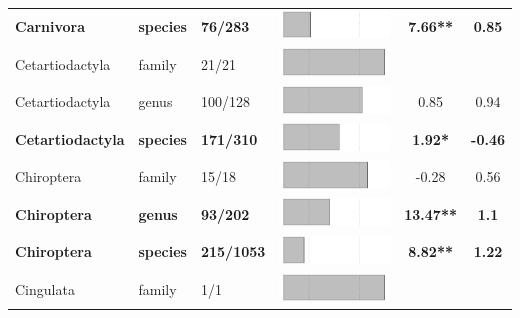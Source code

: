 \begin{longtable}{lL{1.8cm}C{2cm}lcc}
  \textbf{Carnivora} & \textbf{species} & \textbf{76/283} & \includegraphics[width=0.20\linewidth, height=0.05\linewidth]{Results_1c/Table_figures/bar6.pdf} & \textbf{7.66**} & \textbf{0.85} \\ 
  Cetartiodactyla & family & 21/21 & \includegraphics[width=0.20\linewidth, height=0.05\linewidth]{Results_1c/Table_figures/bar7.pdf} &   &   \\ 
  Cetartiodactyla & genus & 100/128 & \includegraphics[width=0.20\linewidth, height=0.05\linewidth]{Results_1c/Table_figures/bar8.pdf} & 0.85 & 0.94 \\ 
  \textbf{Cetartiodactyla} & \textbf{species} & \textbf{171/310} & \includegraphics[width=0.20\linewidth, height=0.05\linewidth]{Results_1c/Table_figures/bar9.pdf} & \textbf{1.92*} & \textbf{-0.46} \\ 
  Chiroptera & family & 15/18 & \includegraphics[width=0.20\linewidth, height=0.05\linewidth]{Results_1c/Table_figures/bar10.pdf} & -0.28 & 0.56 \\ 
  \textbf{Chiroptera} & \textbf{genus} & \textbf{93/202} & \includegraphics[width=0.20\linewidth, height=0.05\linewidth]{Results_1c/Table_figures/bar11.pdf} & \textbf{13.47**} & \textbf{1.1} \\ 
  \textbf{Chiroptera} & \textbf{species} & \textbf{215/1053} & \includegraphics[width=0.20\linewidth, height=0.05\linewidth]{Results_1c/Table_figures/bar12.pdf} & \textbf{8.82**} & \textbf{1.22} \\ 
  Cingulata & family & 1/1 & \includegraphics[width=0.20\linewidth, height=0.05\linewidth]{Results_1c/Table_figures/bar13.pdf} &   &   \\ 

\end{longtable}
